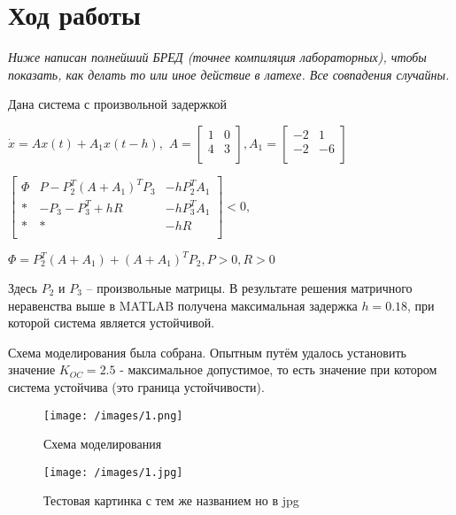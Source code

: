 \section{Ход работы}

\textit{Ниже написан полнейший БРЕД (точнее компиляция лабораторных), чтобы показать, как делать то или иное действие в латехе. Все совпадения случайны.}

Дана система с произвольной задержкой

$\dot{x} = Ax(t) + A_1 x (t-h), $
$A = 
\begin{bmatrix}
1 &  0\\
4 & 3\\
\end{bmatrix},
A_1 = 
\begin{bmatrix}
-2 & 1 \\
-2 & -6\\
\end{bmatrix}$

$\begin{bmatrix}
\Phi & P - P_2^T (A+A_1)^T P_3 & -h P_2^T A_1\\
* & -P_3 - P_3^T + hR & -h P_3^T A_1\\
* & * & -hR\\
\end{bmatrix} < 0,
$

$\Phi = P_2^T (A+A_1) + (A+A_1)^T P_2, P > 0, R > 0$

Здесь $P_2$ и $P_3$ – произвольные матрицы. В результате решения матричного неравенства выше в MATLAB получена максимальная задержка $h = 0.18$, при которой система является устойчивой. 

Схема моделирования была собрана. Опытным путём удалось установить значение $K_{OC} = 2.5$ - максимальное допустимое, то есть значение при котором система устойчива (это граница устойчивости).

\begin{figure}[H]
    \centering
\texttt{[image: /images/1.png]}
    \caption{Схема моделирования}
    \label{fig:p1}
\end{figure}

\begin{figure}[H]
    \centering
\texttt{[image: /images/1.jpg]}
    \caption{Тестовая картинка с тем же названием но в jpg}
    \label{fig:p1_jpg}
\end{figure}


